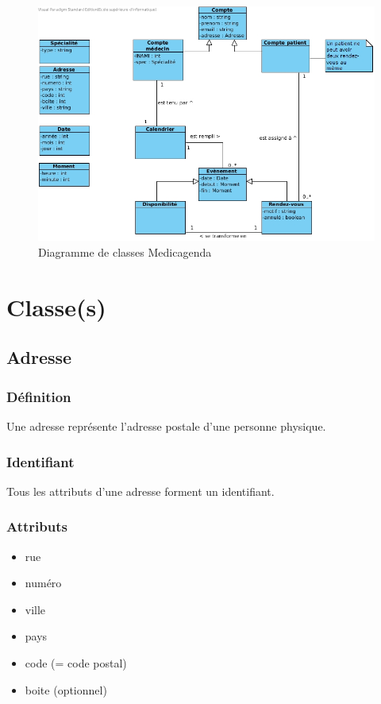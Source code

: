 \documentclass[a4paper, 11pt]{report}
\begin{document}
\begin{figure}[hb]
    \centering
    \includegraphics[scale=0.4]{MCD.jpg}
    \caption{Diagramme de classes Medicagenda}
\end{figure}

\newpage
\section{Classe(s)}


\subsection{Adresse}

\subsubsection{Définition}

Une adresse représente l'adresse postale d'une personne physique.

\subsubsection{Identifiant}

Tous les attributs d'une adresse forment un identifiant.

\subsubsection{Attributs}

\begin{itemize}
    \item rue
    \item numéro
    \item ville
    \item pays
    \item code (= code postal)
    \item boite (optionnel)
\end{itemize}
\end{document}
